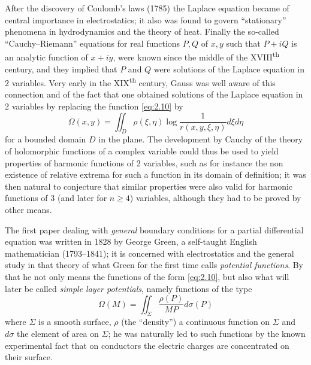 \documentclass[12pt,a4paper,leqno,twoside]{extbook}
\newcommand{\supth}{\texorpdfstring{\textsuperscript{th}}{th}}
\begin{document}
After the discovery of Coulomb's laws (1785) the Laplace equation became of central importance in electrostatics; it also was found to govern ``stationary'' phenomena in hydrodynamics and the theory of heat. Finally the so-called ``Cauchy--Riemann'' equations for real functions \(P, Q\) of \(x, y\) such that \(P + iQ\) is an analytic function of \(x + iy\), were known since the middle of the XVIII\supth{} century, and they implied that \(P\) and \(Q\) were solutions of the Laplace equation in 2 variables. Very early in the XIX\supth{} century, Gauss was well aware of this connection and of the fact that one obtained solutions of the Laplace equation in 2 variables by replacing the function \eqref{eq:2.10} by
\begin{equation}
    \label{eq:2.13}
    \Omega(x, y) = \iint_D \rho(\xi, \eta) \log\frac{1}{r(x, y, \xi, \eta)} d\xi d\eta
\end{equation}
for a bounded domain \(D\) in the plane. The development by Cauchy of the theory of holomorphic functions of a complex variable could thus be used to yield properties of harmonic functions of 2 variables, such as for instance the non existence of relative extrema for such a function in its domain of definition; it was then natural to conjecture that similar properties were also valid for harmonic functions of 3 (and later for \(n \geq 4\)) variables, although they had to be proved by other means.

The first paper dealing with \emph{general} boundary conditions for a partial differential equation was written in 1828 by George Green, a self-taught English mathematician (1793--1841); it is concerned with electrostatics and the general study in that theory of what Green for the first time calls \emph{potential functions}. By that he not only means the functions of the form \eqref{eq:2.10}, but also what will later be called \emph{simple layer potentials}, namely functions of the type
\begin{equation}
    \label{eq:2.14}
    \Omega(M) = \iint_\Sigma \frac{\rho(P)}{MP} d\sigma(P)
\end{equation}
where \(\Sigma\) is a smooth surface, \(\rho\) (the ``density'') a continuous function on \(\Sigma\) and \(d\sigma\) the element of area on \(\Sigma\); he was naturally led to such functions by the known experimental fact that on conductors the electric charges are concentrated on their surface.
\end{document}
